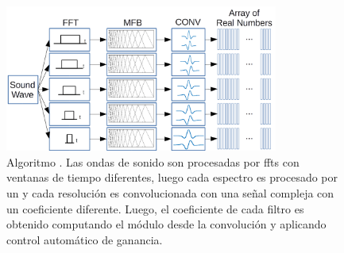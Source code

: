
\begin{figure}[h!]
    \centering
    \includegraphics[width=0.8\textwidth]{MRSTSA.png}
    \caption{Algoritmo . Las ondas de sonido son procesadas por \glspl{fft} con ventanas de tiempo diferentes, luego cada espectro es procesado por
    un  y cada resolución es convolucionada con una señal compleja con un coeficiente diferente. Luego, el coeficiente de cada filtro
    es obtenido computando el módulo desde la convolución y aplicando control automático de ganancia.}
    \label{fig:MRSTSA}
\end{figure}

